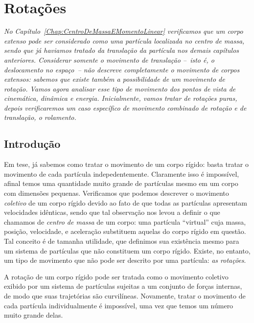 \chapter{Rotações}\label{Chap:Rotacoes}



\begin{fullwidth}
{\it
No Capítulo~\ref{Chap:CentroDeMassaEMomentoLinear} verificamos que um corpo extenso pode ser considerado como uma partícula localizada no centro de massa, sendo que já haviamos tratado da translação da partícula nos demais capítulos anteriores. Considerar somente o movimento de translação --~isto é, o deslocamento no espaço~-- não descreve completamente o movimento de corpos extensos: sabemos que existe também a possibilidade de um movimento de rotação. Vamos agora analisar esse tipo de movimento dos pontos de vista de cinemática, dinâmica e energia. Inicialmente, vamos tratar de rotações puras, depois verificaremos um caso específico de movimento combinado de rotação e de translação, o rolamento.
}
\end{fullwidth}

\section{Introdução}

Em tese, já sabemos como tratar o movimento de um corpo rígido: basta tratar o movimento de cada partícula indepedentemente. Claramente isso é impossível, afinal temos uma quantidade muito grande de partículas mesmo em um corpo com dimensões pequenas. Verificamos que podemos descrever o movimento \emph{coletivo} de um corpo rígido devido ao fato de que todas as partículas apresentam velocidades idênticas, sendo que tal observação nos levou a definir o que chamamos de \emph{centro de massa} de um corpo: uma partícula ``virtual'' cuja massa, posição, velocidade, e aceleração substituem aquelas do corpo rígido em questão. Tal conceito é de tamanha utilidade, que definimos sua existência mesmo para um sistema de partículas que não constituem um corpo rígido. Existe, no entanto, um tipo de movimento que não pode ser descrito por uma partícula: \emph{as rotações}.

A rotação de um corpo rígido pode ser tratada como o movimento coletivo exibido por um sistema de partículas sujeitas a um conjunto de forças internas, de modo que suas trajetórias são curvilíneas. Novamente, tratar o movimento de cada partícula individualmente é impossível, uma vez que temos um número muito grande delas.

